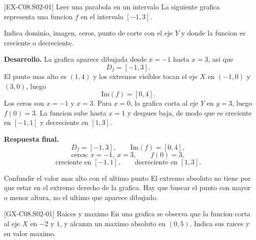 \begin{solvedexample}{[EX-C08.S02-01] Leer una parabola en un intervalo}
La siguiente grafica representa una funcion \(f\) en el intervalo \([-1,3]\).

\begin{center}
\end{center}

Indica dominio, imagen, ceros, punto de corte con el eje \(Y\) y donde la funcion es creciente
o decreciente.

\textbf{Desarrollo.} La grafica aparece dibujada desde \(x=-1\) hasta \(x=3\), asi que
\[
D_f=[-1,3].
\]
El punto mas alto es \((1,4)\) y los extremos visibles tocan el eje \(X\) en \((-1,0)\) y
\((3,0)\), luego
\[
\mathrm{Im}(f)=[0,4].
\]
Los ceros son \(x=-1\) y \(x=3\). Para \(x=0\), la grafica corta al eje \(Y\) en \(y=3\),
luego \(f(0)=3\). La funcion sube hasta \(x=1\) y despues baja, de modo que es creciente en
\([-1,1]\) y decreciente en \([1,3]\).

\textbf{Respuesta final.}
\[
D_f=[-1,3],\qquad \mathrm{Im}(f)=[0,4],
\]
\[
\text{ceros: }x=-1,\ x=3,\qquad f(0)=3,
\]
\[
\text{creciente en }[-1,1],\qquad \text{decreciente en }[1,3].
\]
\end{solvedexample}

\begin{commonerror}{Confundir el valor mas alto con el ultimo punto}
El extremo absoluto no tiene por que estar en el extremo derecho de la grafica. Hay que buscar
el punto con mayor o menor altura, no el ultimo que aparece dibujado.
\end{commonerror}

\begin{guidedexercise}{[GX-C08.S02-01] Raices y maximo}
En una grafica se observa que la funcion corta al eje \(X\) en \(-2\) y \(1\), y alcanza un
maximo absoluto en \((0,5)\). Indica sus raices y su valor maximo.
\end{guidedexercise}

